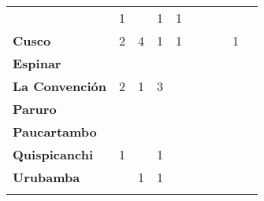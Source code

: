 \begin{tabular}{lccccccccc}
	&1
	&\cellcolor[HTML]{FCC46C}
	&1
	&1
	&\cellcolor[HTML]{FCC46C}
	&\cellcolor[HTML]{FCC46C}\\
	\textbf{Cusco}     		
	&2
	&4											
	&1
	&1
	&\cellcolor[HTML]{FCC46C}
	&\cellcolor[HTML]{FCC46C}
	&\cellcolor[HTML]{FCC46C}
	&1\\								
	\textbf{Espinar}       					             							
	&\cellcolor[HTML]{FCC46C}					
	&\cellcolor[HTML]{FCC46C}
	&\cellcolor[HTML]{FCC46C}					
	&\cellcolor[HTML]{FCC46C}
	&\cellcolor[HTML]{FCC46C}					
	&\cellcolor[HTML]{FCC46C}
	&\cellcolor[HTML]{FCC46C}
	&\cellcolor[HTML]{FCC46C}\\	
	\textbf{La Convención}      			
	&2											
	&1											
	&3
	&\cellcolor[HTML]{FCC46C}
	&\cellcolor[HTML]{FCC46C}
	&\cellcolor[HTML]{FCC46C}
	&\cellcolor[HTML]{FCC46C}
	&\cellcolor[HTML]{FCC46C}\\	
	\textbf{Paruro}                            					
	&\cellcolor[HTML]{FCC46C}					
	&\cellcolor[HTML]{FCC46C}					
	&\cellcolor[HTML]{FCC46C}					
	&\cellcolor[HTML]{FCC46C}					
	&\cellcolor[HTML]{FCC46C}
	&\cellcolor[HTML]{FCC46C} 					
	&\cellcolor[HTML]{FCC46C}
	&\cellcolor[HTML]{FCC46C}\\
	\textbf{Paucartambo}               		                       					
	&\cellcolor[HTML]{FCC46C}					
	&\cellcolor[HTML]{FCC46C}
	&\cellcolor[HTML]{FCC46C}					
	&\cellcolor[HTML]{FCC46C}
	&\cellcolor[HTML]{FCC46C}					
	&\cellcolor[HTML]{FCC46C}
	&\cellcolor[HTML]{FCC46C}
	&\cellcolor[HTML]{FCC46C}\\
	\textbf{Quispicanchi}     
	&1											
	&\cellcolor[HTML]{FCC46C}					
	&1
	&\cellcolor[HTML]{FCC46C}
	&\cellcolor[HTML]{FCC46C}
	&\cellcolor[HTML]{FCC46C}
	&\cellcolor[HTML]{FCC46C}
	&\cellcolor[HTML]{FCC46C}\\
	\textbf{Urubamba}  		
	&\cellcolor[HTML]{FCC46C}					
	&1											
	&1	
	&\cellcolor[HTML]{FCC46C}
	&\cellcolor[HTML]{FCC46C}
	&\cellcolor[HTML]{FCC46C}
	&\cellcolor[HTML]{FCC46C}
	&\cellcolor[HTML]{FCC46C}\\						
	&\multicolumn{1}{l}{}                       &\multicolumn{1}{l}{}            &\multicolumn{1}{l}{}                         
	&\multicolumn{1}{l}{}                       &\multicolumn{1}{l}{}            &\multicolumn{1}{l}{}                       &\multicolumn{1}{l}{}                       &\multicolumn{1}{l}{}            			    
\end{tabular}